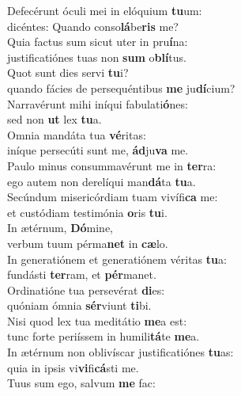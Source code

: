 \evenverse Defecérunt óculi mei in elóquium \textbf{tu}um:~\*\\
\evenverse dicéntes: Quando conso\textbf{lá}be\textbf{ris} me?\\
\oddverse Quia factus sum sicut uter in pru\textbf{í}na:~\*\\
\oddverse justificatiónes tuas non \textbf{sum} o\textbf{blí}tus.\\
\evenverse Quot sunt dies servi \textbf{tu}i?~\*\\
\evenverse quando fácies de persequéntibus \textbf{me} ju\textbf{dí}cium?\\
\oddverse Narravérunt mihi iníqui fabulati\textbf{ó}nes:~\*\\
\oddverse sed non \textbf{ut} lex \textbf{tu}a.\\
\evenverse Omnia mandáta tua \textbf{vé}ritas:~\*\\
\evenverse iníque persecúti sunt me, \textbf{ád}ju\textbf{va} me.\\
\oddverse Paulo minus consummavérunt me in \textbf{ter}ra:~\*\\
\oddverse ego autem non derelíqui man\textbf{dá}ta \textbf{tu}a.\\
\evenverse Secúndum misericórdiam tuam vivífi\textbf{ca} me:~\*\\
\evenverse et custódiam testimónia \textbf{o}ris \textbf{tu}i.\\
\oddverse In ætérnum, \textbf{Dó}mine,~\*\\
\oddverse verbum tuum pérma\textbf{net} in \textbf{cæ}lo.\\
\evenverse In generatiónem et generatiónem véritas \textbf{tu}a:~\*\\
\evenverse fundásti \textbf{ter}ram, et \textbf{pér}manet.\\
\oddverse Ordinatióne tua persevérat \textbf{di}es:~\*\\
\oddverse quóniam ómnia \textbf{sér}viunt \textbf{ti}bi.\\
\evenverse Nisi quod lex tua meditátio \textbf{me}a est:~\*\\
\evenverse tunc forte periíssem in humili\textbf{tá}te \textbf{me}a.\\
\oddverse In ætérnum non oblivíscar justificatiónes \textbf{tu}as:~\*\\
\oddverse quia in ipsis vi\textbf{vi}fi\textbf{cá}sti me.\\
\evenverse Tuus sum ego, salvum \textbf{me} fac:~\*\\
